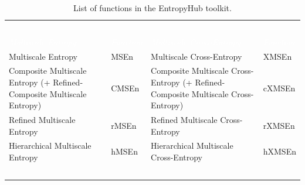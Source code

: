 \documentclass[12pt, a4paper, titlepage, openany]{book}
\begin{document}
\begin{center}
\begin{table}[!ht]
\begin{tabular}{|p{6cm}|p{15mm}|p{6cm}|p{20mm}|}
\						&	\				&		\						&	\\ 	 	 
\rowcolor{ehone} \emph{\textcolor{white}{Multiscale Entropy}} &	\emph{\textcolor{white}{Function}}	&  \emph{\textcolor{white}{Multiscale Cross-Entropy}}		&	\emph{\textcolor{white}{Function}} \\
Multiscale Entropy		&	MSEn			&	Multiscale Cross-Entropy	&	XMSEn \\
Composite Multiscale Entropy (+ Refined-Composite Multiscale Entropy) & 	CMSEn		&	Composite Multiscale Cross-Entropy (+ Refined-Composite Multiscale Cross-Entropy)	& cXMSEn \\
Refined Multiscale Entropy	& rMSEn			&	Refined Multiscale Cross-Entropy	&	rXMSEn  \\
Hierarchical Multiscale Entropy	&	hMSEn	&	Hierarchical Multiscale Cross-Entropy &	hXMSEn \\
\						&	\				&		\						&	\\ 	 	 
\hline
\end{tabular}

\caption{List of functions in the EntropyHub toolkit.}
\label{table: tab_1}
\end{table}
\end{center}

\newpage
\end{document}
